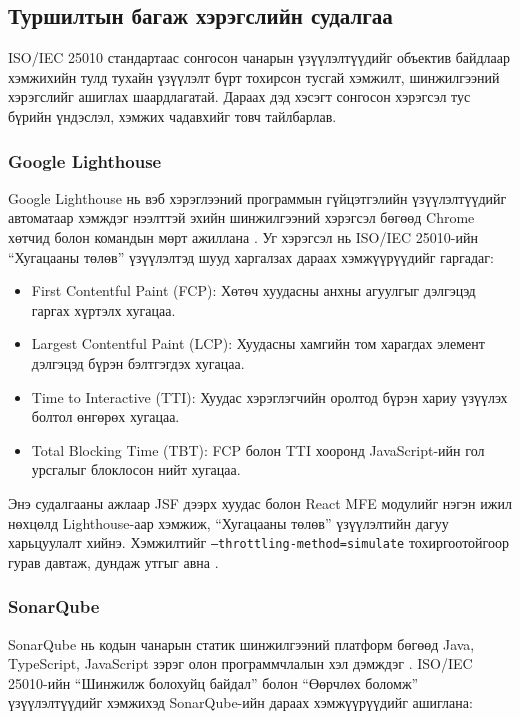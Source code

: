 \subsection{Туршилтын багаж хэрэгслийн судалгаа}

ISO/IEC 25010 стандартаас сонгосон чанарын үзүүлэлтүүдийг объектив байдлаар хэмжихийн тулд тухайн үзүүлэлт бүрт тохирсон тусгай хэмжилт, шинжилгээний хэрэгслийг ашиглах шаардлагатай. Дараах дэд хэсэгт сонгосон хэрэгсэл тус бүрийн үндэслэл, хэмжих чадавхийг товч тайлбарлав.

\subsubsection{Google Lighthouse}

\hspace*{0.6cm}Google Lighthouse нь вэб хэрэглээний программын гүйцэтгэлийн үзүүлэлтүүдийг автоматаар хэмждэг нээлттэй эхийн шинжилгээний хэрэгсэл бөгөөд Chrome хөтчид болон командын мөрт ажиллана \cite{lighthouse_google}. Уг хэрэгсэл нь ISO/IEC 25010-ийн ``Хугацааны төлөв'' үзүүлэлтэд шууд харгалзах дараах хэмжүүрүүдийг гаргадаг:

\begin{itemize}
  \item First Contentful Paint (FCP): Хөтөч хуудасны анхны агуулгыг дэлгэцэд гаргах хүртэлх хугацаа.
  \item Largest Contentful Paint (LCP): Хуудасны хамгийн том харагдах элемент дэлгэцэд бүрэн бэлтгэгдэх хугацаа.
  \item Time to Interactive (TTI): Хуудас хэрэглэгчийн оролтод бүрэн хариу үзүүлэх болтол өнгөрөх хугацаа.
  \item Total Blocking Time (TBT): FCP болон TTI хооронд JavaScript-ийн гол урсгалыг блоклосон нийт хугацаа.
\end{itemize}

Энэ судалгааны ажлаар JSF дээрх хуудас болон React MFE модулийг нэгэн ижил нөхцөлд Lighthouse-аар хэмжиж, ``Хугацааны төлөв'' үзүүлэлтийн дагуу харьцуулалт хийнэ. Хэмжилтийг \texttt{--throttling-method=simulate} тохиргоотойгоор гурав давтаж, дундаж утгыг авна \cite{ameer2024}.

\subsubsection{SonarQube}

\hspace*{0.6cm}SonarQube нь кодын чанарын статик шинжилгээний платформ бөгөөд Java, TypeScript, JavaScript зэрэг олон программчлалын хэл дэмждэг \cite{sonarqube_docs}. ISO/IEC 25010-ийн ``Шинжилж болохуйц байдал'' болон ``Өөрчлөх боломж'' үзүүлэлтүүдийг хэмжихэд SonarQube-ийн дараах хэмжүүрүүдийг ашиглана:

